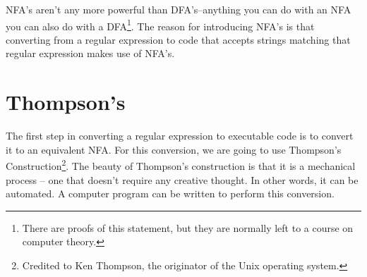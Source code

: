 \documentclass[letterpaper,12pt,openany,reqno]{book}%
\begin{document}
NFA's aren't any more powerful than DFA's--anything you can do with an NFA you can also do with a DFA\footnote{There are proofs of this statement, but they are normally left to a course on computer theory.}. The reason for introducing NFA's is that converting from a regular expression to code that accepts strings matching that regular expression makes use of NFA's.

\section{Thompson's}

The first step in converting a regular expression to executable code is to convert it to an equivalent NFA. For this conversion, we are going to use Thompson's Construction\footnote{Credited to Ken Thompson, the originator of the Unix operating system.}. The beauty of Thompson's construction is that it is a mechanical process -- one that doesn't require any creative thought. In other words, it can be automated. A computer program can be written to perform this conversion.
\end{document}
